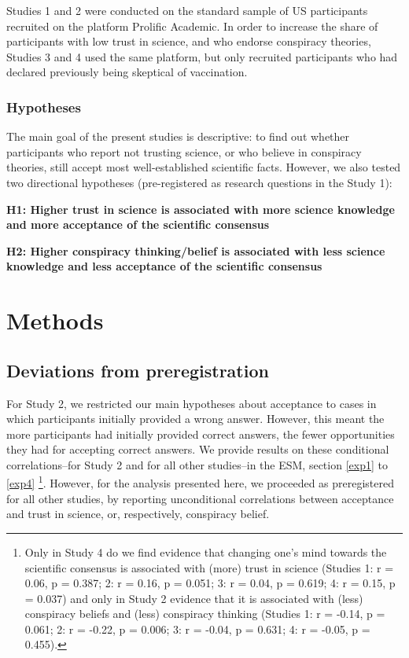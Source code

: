 \documentclass[
  doc,floatsintext]{apa6}
\begin{document}
Studies 1 and 2 were conducted on the standard sample of US participants recruited on the platform Prolific Academic. In order to increase the share of participants with low trust in science, and who endorse conspiracy theories, Studies 3 and 4 used the same platform, but only recruited participants who had declared previously being skeptical of vaccination.

\subsubsection{Hypotheses}\label{hypotheses}

The main goal of the present studies is descriptive: to find out whether participants who report not trusting science, or who believe in conspiracy theories, still accept most well-established scientific facts. However, we also tested two directional hypotheses (pre-registered as research questions in the Study 1):

\textbf{H1: Higher trust in science is associated with more science knowledge and more acceptance of the scientific consensus}

\textbf{H2: Higher conspiracy thinking/belief is associated with less science knowledge and less acceptance of the scientific consensus}

\section{Methods}\label{methods}

\subsection{Deviations from preregistration}\label{deviations-from-preregistration}

For Study 2, we restricted our main hypotheses about acceptance to cases in which participants initially provided a wrong answer. However, this meant the more participants had initially provided correct answers, the fewer opportunities they had for accepting correct answers. We provide results on these conditional correlations--for Study 2 and for all other studies--in the ESM, section \ref{exp1} to \ref{exp4} \footnote{Only in Study 4 do we find evidence that changing one's mind towards the scientific consensus is associated with (more) trust in science (Studies 1: r = 0.06, p = 0.387; 2: r = 0.16, p = 0.051; 3: r = 0.04, p = 0.619; 4: r = 0.15, p = 0.037) and only in Study 2 evidence that it is associated with (less) conspiracy beliefs and (less) conspiracy thinking (Studies 1: r = -0.14, p = 0.061; 2: r = -0.22, p = 0.006; 3: r = -0.04, p = 0.631; 4: r = -0.05, p = 0.455).}. However, for the analysis presented here, we proceeded as preregistered for all other studies, by reporting unconditional correlations between acceptance and trust in science, or, respectively, conspiracy belief.
\end{document}
